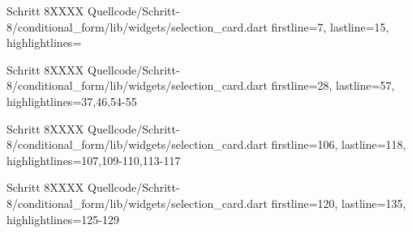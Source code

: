   \begin{alexlisting}{Schritt 8}{XXXX}
    {Quellcode/Schritt-8/conditional_form/lib/widgets/selection_card.dart}
    {firstline=7, lastline=15, highlightlines={}}
    \label{lst:Schritt6XXXX}
\end{alexlisting}
\begin{alexlisting}{Schritt 8}{XXXX}
    {Quellcode/Schritt-8/conditional_form/lib/widgets/selection_card.dart}
    {firstline=28, lastline=57, highlightlines={37,46,54-55}}
    \label{lst:Schritt6XXXX}
\end{alexlisting}
\begin{alexlisting}{Schritt 8}{XXXX}
    {Quellcode/Schritt-8/conditional_form/lib/widgets/selection_card.dart}
    {firstline=106, lastline=118, highlightlines={107,109-110,113-117}}
    \label{lst:Schritt6XXXX}
\end{alexlisting}

\begin{alexlisting}{Schritt 8}{XXXX}
    {Quellcode/Schritt-8/conditional_form/lib/widgets/selection_card.dart}
    {firstline=120, lastline=135, highlightlines={125-129}}
    \label{lst:Schritt6XXXX}
\end{alexlisting} 

\ifincludeall \clearpage \fi 
